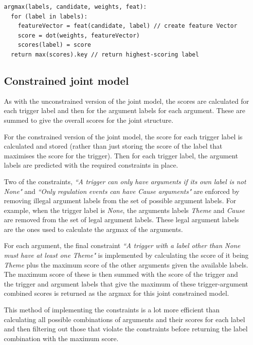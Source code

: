 \documentclass{article} %
\begin{document}
\begin{verbatim}
argmax(labels, candidate, weights, feat):
  for (label in labels):
    featureVector = feat(candidate, label) // create feature Vector
    score = dot(weights, featureVector)
    scores(label) = score
  return max(scores).key // return highest-scoring label
\end{verbatim}

\subsection{Constrained joint model}
As with the unconstrained version of the joint model, the scores are calculated for each trigger label and then for the argument labels for each argument. These are summed to give the overall scores for the joint structure.

For the constrained version of the joint model, the score for each trigger label is calculated and stored (rather than just storing the score of the label that maximises the score for the trigger). Then for each trigger label, the argument labels are predicted with the required constraints in place.

Two of the constraints, \emph{``A trigger can only have arguments if its own label is not None"} and \emph{``Only regulation events can have Cause arguments"} are enforced by removing illegal argument labels from the set of possible argument labels. For example, when the trigger label is \emph{None}, the arguments labels \emph{Theme} and \emph{Cause} are removed from the set of legal argument labels. These legal argument labels are the ones used to calculate the argmax of the arguments.

For each argument, the final constraint 
\emph{``A trigger with a label other than None must have at least one Theme"} is implemented by calculating the score of it being \emph{Theme} plus the maximum score of the other arguments given the available labels. The maximum score of these is then summed with the score of the trigger and the trigger and argument labels that give the maximum of these trigger-argument combined scores is returned as the argmax for this joint constrained model.

This method of implementing the constraints is a lot more efficient than calculating all possible combinations of arguments and their scores for each label and then filtering out those that violate the constraints before returning the label combination with the maximum score.
\end{document}
